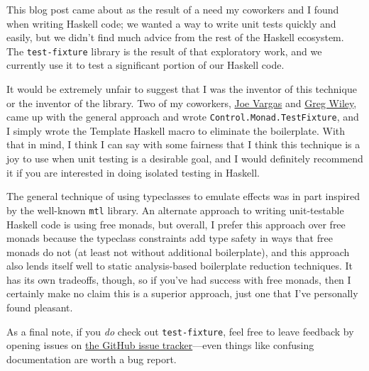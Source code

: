 This blog post came about as the result of a need my coworkers and I
found when writing Haskell code; we wanted a way to write unit tests
quickly and easily, but we didn't find much advice from the rest of the
Haskell ecosystem. The \texttt{test-fixture} library is the result of
that exploratory work, and we currently use it to test a significant
portion of our Haskell code.

It would be extremely unfair to suggest that I was the inventor of this
technique or the inventor of the library. Two of my coworkers,
\href{https://github.com/jxv}{Joe Vargas} and
\href{https://github.com/aztecrex}{Greg Wiley}, came up with the general
approach and wrote \texttt{Control.Monad.TestFixture}, and I simply
wrote the Template Haskell macro to eliminate the boilerplate. With that
in mind, I think I can say with some fairness that I think this
technique is a joy to use when unit testing is a desirable goal, and I
would definitely recommend it if you are interested in doing isolated
testing in Haskell.

The general technique of using typeclasses to emulate effects was in
part inspired by the well-known \texttt{mtl} library. An alternate
approach to writing unit-testable Haskell code is using free monads, but
overall, I prefer this approach over free monads because the typeclass
constraints add type safety in ways that free monads do not (at least
not without additional boilerplate), and this approach also lends itself
well to static analysis-based boilerplate reduction techniques. It has
its own tradeoffs, though, so if you've had success with free monads,
then I certainly make no claim this is a superior approach, just one
that I've personally found pleasant.

As a final note, if you \emph{do} check out \texttt{test-fixture}, feel
free to leave feedback by opening issues on
\href{https://github.com/cjdev/test-fixture/issues}{the GitHub issue
tracker}---even things like confusing documentation are worth a bug
report.
